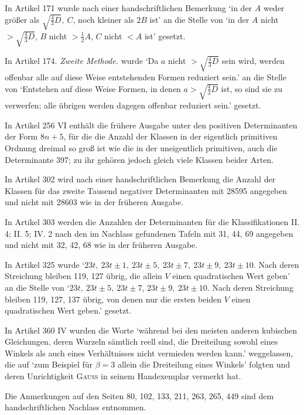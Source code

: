 In Artikel 171 wurde nach einer handschriftlichen Bemerkung ‘in der \(A\) weder größer als \(\surd{\frac43D},\allowbreak\ C\), noch kleiner als \(2B\) ist’ an die Stelle von ‘in der \(A\) nicht \(>\surd{\frac43D}\), \(B\) nicht \(>\frac12A\), \(C\) nicht \(<A\) ist’ gesetzt.

In Artikel 174. \textit{Zweite Methode.} wurde ‘Da \(a\) nicht \(>\surd{\frac43D}\) sein wird, werden offenbar alle auf diese Weise entstehenden Formen reduziert sein.’ an die Stelle von ‘Entstehen auf diese Weise Formen, in denen \(a>\surd{\frac43D}\) ist, so sind sie zu verwerfen; alle übrigen werden dagegen offenbar reduziert sein.’ gesetzt.

In Artikel 256 VI enthält die frühere Ausgabe unter den positiven Determinanten der Form \(8n+5\), für die die Anzahl der Klassen in der eigentlich primitiven Ordnung dreimal so groß ist wie die in der uneigentlich primitiven, auch die Determinante 397; zu ihr gehören jedoch gleich viele Klassen beider Arten.

In Artikel 302 wird nach einer handschriftlichen Bemerkung die Anzahl der Klassen für das zweite Tausend negativer Determinanten mit 28595 angegeben und nicht mit 28603 wie in der früheren Ausgabe.

In Artikel 303 werden die Anzahlen der Determinanten für die Klassifikationen II. 4; II. 5; IV. 2 nach den im Nachlass gefundenen Tafeln mit 31, 44, 69 angegeben und nicht mit 32, 42, 68 wie in der früheren Ausgabe.

In Artikel 325 wurde ‘\(23t,\allowbreak\ 23t\pm1,\allowbreak\ 23t\pm5,\allowbreak\ 23t\pm7,\allowbreak\ 23t\pm9,\allowbreak\ 23t\pm10\). Nach deren Streichung bleiben 119, 127 übrig, die allein \(V\) einen quadratischen Wert geben’ an die Stelle von ‘\(23t,\allowbreak\ 23t\pm5,\allowbreak\ 23t\pm7\), \(23t\pm9,\allowbreak\ 23t\pm10\). Nach deren Streichung bleiben 119, 127, 137 übrig, von denen nur die ersten beiden \(V\) einen quadratischen Wert geben.’ gesetzt.

In Artikel 360 IV wurden die Worte ‘während bei den meisten anderen kubischen Gleichungen, deren Wurzeln sämtlich reell sind, die Dreiteilung sowohl eines Winkels als auch eines Verhältnisses nicht vermieden werden kann.’ weggelassen, die auf ‘zum Beispiel für \(\beta=3\) allein die Dreiteilung eines Winkels’ folgten und deren Unrichtigkeit \textsc{Gauss} in seinem Handexemplar vermerkt hat.

Die Anmerkungen auf den Seiten 80, 102, 133, 211, 263, 265, 449 sind dem handschriftlichen Nachlass entnommen.


